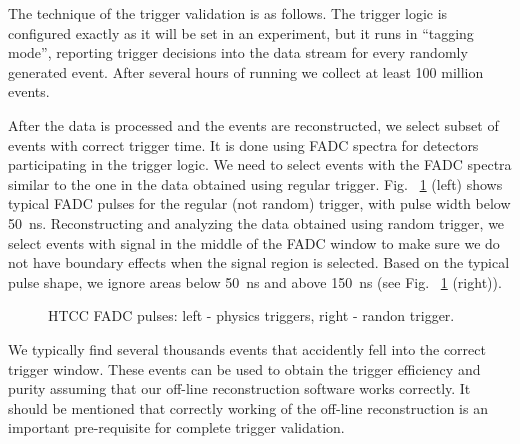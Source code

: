 The technique of the trigger validation is as follows. The trigger logic is configured exactly as it will be set in an experiment, but it runs in ``tagging mode'', reporting trigger decisions into the data stream for every randomly generated event. After several hours of running we collect at least 100 million events.

After the data is processed and the events are reconstructed, we select subset of events with correct trigger time. It is done using FADC spectra for detectors participating in the trigger logic. We need to select events with the FADC spectra similar to the one in the data obtained using regular trigger. Fig. ~\ref{fig:htcc_fadc} (left) shows typical FADC pulses for the regular (not random) trigger, with pulse width below 50~ns. Reconstructing and analyzing the data obtained using random trigger, we select events with signal in the middle of the FADC window to make sure we do not have boundary effects when the signal region is selected. Based on the typical pulse shape, we ignore areas below 50~ns and above 150~ns (see Fig. ~\ref{fig:htcc_fadc} (right)).

\begin{figure}[!htb]
	\centering
	\caption{HTCC FADC pulses: left - physics triggers, right - randon trigger. }
	\label{fig:htcc_fadc}
\end{figure}

We typically find several thousands events that accidently fell into the correct trigger window. These events can be used to obtain the trigger efficiency and purity assuming that our off-line reconstruction software works correctly. It should be mentioned that correctly working of the off-line reconstruction is an important pre-requisite for complete trigger validation.


